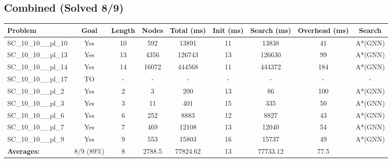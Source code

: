 \documentclass{article}
\begin{document}
\subsection*{Combined (Solved 8/9)}
\begin{tabular}{lcccccccc}
\toprule
Problem & Goal & Length & Nodes & Total (ms) & Init (ms) & Search (ms) & Overhead (ms) & Search \\
\midrule
SC\_10\_10\_\_pl\_10 & Yes & 10 & 592 & 13891 & 11 & 13838 & 41 & A*(GNN) \\
SC\_10\_10\_\_pl\_13 & Yes & 13 & 4356 & 126743 & 13 & 126630 & 99 & A*(GNN) \\
SC\_10\_10\_\_pl\_14 & Yes & 14 & 16072 & 444568 & 11 & 444372 & 184 & A*(GNN) \\
SC\_10\_10\_\_pl\_17 & TO & - & - & - & - & - & - & - \\
SC\_10\_10\_\_pl\_2 & Yes & 2 & 3 & 200 & 13 & 86 & 100 & A*(GNN) \\
SC\_10\_10\_\_pl\_3 & Yes & 3 & 11 & 401 & 15 & 335 & 50 & A*(GNN) \\
SC\_10\_10\_\_pl\_6 & Yes & 6 & 252 & 8883 & 12 & 8827 & 43 & A*(GNN) \\
SC\_10\_10\_\_pl\_7 & Yes & 7 & 469 & 12108 & 13 & 12040 & 54 & A*(GNN) \\
SC\_10\_10\_\_pl\_9 & Yes & 9 & 553 & 15803 & 16 & 15737 & 49 & A*(GNN) \\
\textbf{Averages:} & 8/9 (89\%) & 8 & 2788.5 & 77824.62 & 13 & 77733.12 & 77.5 & \\
\bottomrule
\end{tabular}
\\[0.7cm]
\end{document}
